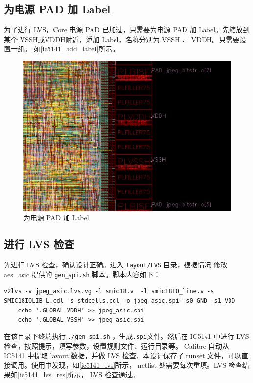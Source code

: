 \documentclass[12pt,hyperref,a4paper,UTF8]{ctexart}
\begin{document}
\subsection{为电源 PAD 加 Label}
为了进行 LVS，Core 电源 PAD 已加过，只需要为电源 PAD 加 Label。先缩放到某个
 VSSH或VDDH附近，添加 Label，名称分别为 VSSH 、 VDDH。只需要设置一组。
如\autoref{ic5141_add_label}所示。

\begin{figure}[htbp]
    \centering
    \includegraphics[width =.5\textwidth]{figures/layout_add_label.png}
    \caption{为电源 PAD 加 Label}
    \label{ic5141_add_label}
\end{figure}

\subsection{进行 LVS 检查}
先进行 LVS 检查，确认设计正确。进入 \texttt{layout/LVS} 目录，根据情况
修改 aes\_asic 提供的 \texttt{gen\_spi.sh} 脚本。脚本内容如下：

\begin{lstlisting}[style=bashstyle,name=gen_spi.sh]
    v2lvs -v jpeg_asic.lvs.vg -l smic18.v  -l smic18IO_line.v -s SMIC18IOLIB_L.cdl -s stdcells.cdl -o jpeg_asic.spi -s0 GND -s1 VDD
    echo '.GLOBAL VDDH' >> jpeg_asic.spi
    echo '.GLOBAL VSSH' >> jpeg_asic.spi
\end{lstlisting}

在该目录下终端执行 \texttt{./gen\_spi.sh} ，生成\texttt{.spi}文件。然后在
IC5141 中进行 LVS 检查，按照提示，填写参数，设置规则文件、运行目录等。
Calibre 自动从 IC5141 中提取 layout 数据，并做 LVS 检查，本设计保存了
 runset 文件，可以直接调用。使用中发现，如\autoref{ic5141_lvs}所示，
netlist 处需要每次重填。LVS 检查结果如\autoref{ic5141_lvs_res}所示，
LVS 检查通过。
\end{document}
